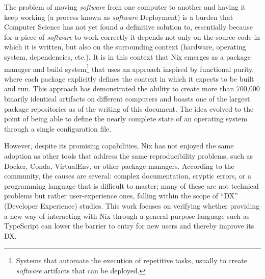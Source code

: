 The problem of moving \emph{software} from one computer to another and having it keep working (a process known as \emph{software} Deployment) is a burden that Computer Science has not yet found a definitive solution to, essentially because for a piece of \emph{software} to work correctly it depends not only on the source code in which it is written, but also on the surrounding context (hardware, operating system, dependencies, etc.). It is in this context that Nix emerges as a package manager and build system\footnote{Systems that automate the execution of repetitive tasks, usually to create \emph{software} artifacts that can be deployed.} that uses an approach inspired by functional purity, where each package explicitly defines the context in which it expects to be built and run. This approach has demonstrated the ability to create more than 700,000 binarily identical artifacts on different computers and boasts one of the largest package repositories as of the writing of this document. The idea evolved to the point of being able to define the nearly complete state of an operating system through a single configuration file.

However, despite its promising capabilities, Nix has not enjoyed the same adoption as other tools that address the same reproducibility problems, such as Docker, Conda, VirtualEnv, or other package managers. According to the community, the causes are several: complex documentation, cryptic errors, or a programming language that is difficult to master; many of these are not technical problems but rather user-experience ones, falling within the scope of ``DX'' (Developer Experience) studies. This work focuses on verifying whether providing a new way of interacting with Nix through a general-purpose language such as TypeScript can lower the barrier to entry for new users and thereby improve its DX.
